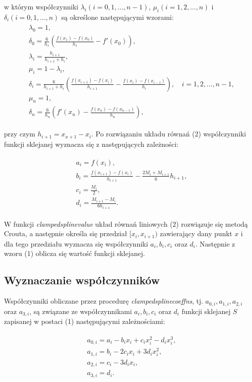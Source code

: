 \documentclass[a4paper, 10pt]{article}
\begin{document}
w którym współczynniki $\lambda_i (i=0,1,...,n-1)$, $\mu_i (i=1,2,...,n)$ i $\delta_i (i=0,1,...,n)$ są określone następującymi wzorami:
\begin{align*}
\begin{split}
&\lambda_0 = 1,\\
&\delta_0 = \frac{6}{h_1}\left(\frac{f(x_1) - f(x_0)}{h_1} - f'(x_0)\right),\\
&\lambda_i = \frac{h_{i+1}}{h_{i+1}+h_i},\\ 
&\mu_i = 1-\lambda_i ,\\
&\delta_i = \frac{6}{h_{i+1}+h_i}\left(\frac{f(x_{i+1})-f(x_i)}{h_{i+1}} - \frac{f(x_i)-f(x_{i-1})}{h_i}\right), \quad i=1,2,...,n-1,\\
&\mu_n=1,\\
&\delta_n = \frac{6}{h_n}\left(f'(x_n) - \frac{f(x_n)-f(x_{n-1})}{h_n}\right),
\end{split}
\end{align*}

przy czym $h_{i+1} = x_{x+1} - x_i$. Po rozwiązaniu układu równań (2) współczynniki funkcji sklejanej wyznacza się z następujących zależności:

\begin{align*}
\begin{split}
&a_i = f(x_i),\\
&b_i = \frac{f(x_{i+1})-f(x_i)}{h_{i+1}} - \frac{2M_i + M_{i+1}}{6}h_{i+1},\\
&c_i = \frac{M_i}{2},\\
&d_i = \frac{M_{i+1}-M_i}{6h_{i+1}}.
\end{split}
\end{align*}

W funkcji \textit{clampedsplinevalue} układ równań liniowych (2) rozwiązuje się metodą Crouta,
a następnie określa się przedział $[x_i,x_{i+1})$ zawierający dany punkt $x$ i dla tego przedziału wyznacza się współczynniki $a_i, b_i, c_i$ oraz $d_i$. Następnie z wzoru (1) oblicza się wartość funkcji sklejanej.

\subsection*{Wyznaczanie współczynników}
Współczynniki obliczane przez procedurę \textit{clampedsplinecoeffns}, tj. $a_{0,i},a_{1,i},a_{2,i}$ oraz $a_{3,i}$, są związane ze współczynnikami $a_i, b_i, c_i$ oraz $d_i$ funkcji sklejanej $S$ zapisanej w postaci (1) następującymi zależnościami: 

\begin{align*}
\begin{split}
&a_{0,i} = a_i - b_ix_i + c_i x_i^2 - d_ix_i^3, \\
&a_{1,i} = b_i - 2c_ix_i + 3d_ix_i^2, \\
&a_{2,i} = c_i - 3d_ix_i, \\
&a_{3,i} = d_i. \\
\end{split}
\end{align*}
\end{document}
